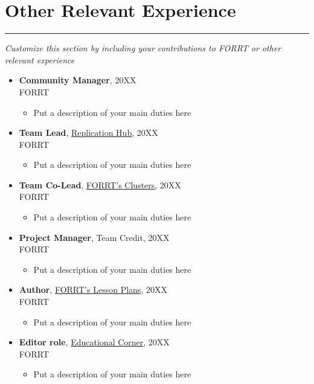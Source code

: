 \documentclass{article}
\begin{document}
\section*{Other Relevant Experience}
\hrule
\vspace{1em}
\textit{Customize this section by including your contributions to FORRT or other relevant experience}
\begin{itemize}[leftmargin=*]
\item \textbf{Community Manager}, 20XX\\
    FORRT
    \begin{itemize}
        \item Put a description of your main duties here
    \end{itemize}
\item \textbf{Team Lead}, \href{https://forrt.org/replication-hub/}{Replication Hub}, 20XX\\
    FORRT
    \begin{itemize}
        \item Put a description of your main duties here
    \end{itemize}
\item \textbf{Team Co-Lead}, \href{https://forrt.org/clusters/}{FORRT's Clusters}, 20XX\\
    FORRT
    \begin{itemize}
        \item Put a description of your main duties here
    \end{itemize}
\item \textbf{Project Manager}, {Team Credit}, 20XX\\
    FORRT
    \begin{itemize}
        \item Put a description of your main duties here
    \end{itemize}
\item \textbf{Author}, \href{https://forrt.org/lesson-plans/}{FORRT's Lesson Plans}, 20XX\\
    FORRT
    \begin{itemize}
        \item Put a description of your main duties here
    \end{itemize}
 \item \textbf{Editor role}, \href{https://forrt.org/educators-corner/}{Educational Corner}, 20XX\\
    FORRT
    \begin{itemize}
        \item Put a description of your main duties here

\end{itemize}
\end{itemize}
\end{document}
